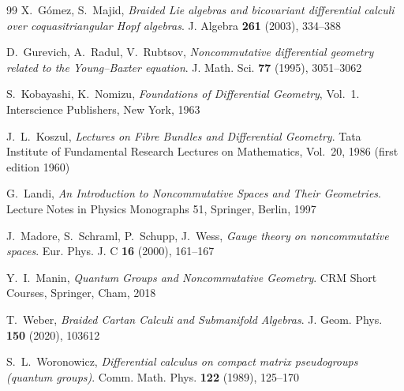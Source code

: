 \documentclass[12pt]{article}
\numberwithin{equation}{section}
\theoremstyle{plain}
\theoremstyle{definition}
\theoremstyle{remark}
\begin{document}
\begin{thebibliography}{99}
X.~Gómez, S.~Majid,
\emph{Braided Lie algebras and bicovariant differential calculi over coquasitriangular Hopf algebras}.
J. Algebra \textbf{261} (2003), 334--388

D.~Gurevich, A.~Radul, V.~Rubtsov,
\emph{Noncommutative differential geometry related to the Young--Baxter equation}.
J. Math. Sci. \textbf{77} (1995), 3051--3062

S.~Kobayashi, K.~Nomizu,
\emph{Foundations of Differential Geometry}, Vol.~1.
Interscience Publishers, New York, 1963

J.~L.~Koszul,
\emph{Lectures on Fibre Bundles and Differential Geometry}.
Tata Institute of Fundamental Research Lectures on Mathematics, Vol.~20, 1986
(first edition 1960)

G.~Landi,
\emph{An Introduction to Noncommutative Spaces and Their Geometries}.
Lecture Notes in Physics Monographs 51,
Springer, Berlin, 1997

J.~Madore, S.~Schraml, P.~Schupp, J.~Wess,
\emph{Gauge theory on noncommutative spaces}.
Eur. Phys. J. C \textbf{16} (2000), 161--167

Y.~I.~Manin,
\emph{Quantum Groups and Noncommutative Geometry}.
CRM Short Courses,
Springer, Cham, 2018

T.~Weber,
\emph{Braided Cartan Calculi and Submanifold Algebras}.
J. Geom. Phys. \textbf{150} (2020), 103612

S.~L.~Woronowicz,
\emph{Differential calculus on compact matrix pseudogroups (quantum groups)}.
Comm. Math. Phys. \textbf{122} (1989), 125--170

\end{thebibliography}
\end{document}
